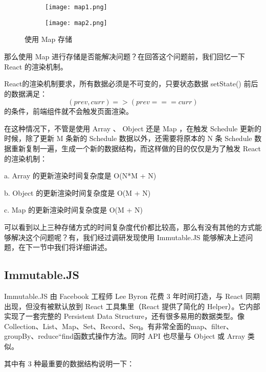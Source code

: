 \begin{figure}[!htp]
    \centering
    \begin{subfigure}{0.3\textwidth}
      \centering
      \texttt{[image: map1.png]}
      \caption{}
    \end{subfigure}
    \hspace{1cm}
    \begin{subfigure}{0.4\textwidth}
      \centering
      \texttt{[image: map2.png]}
      \caption{}
    \end{subfigure}
    \caption{使用 Map 存储}
    \label{fig:map}
  \end{figure}

  那么使用 Map 进行存储是否能解决问题？在回答这个问题前，我们回忆一下 React 的渲染机制。

  React的渲染机制要求，所有数据必须是不可变的，只要状态数据 setState() 前后的数据满足：
  \begin{equation}
    (prev, curr) => (prev === curr)
  \end{equation}
  的条件，前端组件就不会触发页面渲染。

  在这种情况下，不管是使用 Array 、 Object 还是 Map ，在触发 Schedule 更新的时候，除了更新 M 条新的 Schedule 数据以外，还需要将原本的 N 条 Schedule 数据重新复制一遍，生成一个新的数据结构，而这样做的目的仅仅是为了触发 React 的渲染机制：

  \quad{}a. Array 的更新渲染时间复杂度是 O(N*M + N)


  \quad{}b. Object 的更新渲染时间复杂度是 O(M + N)


  \quad{}c. Map 的更新渲染时间复杂度是 O(M + N)

  可以看到以上三种存储方式的时间复杂度代价都比较高，那么有没有其他的方式能够解决这个问题呢？有，我们经过调研发现使用 Immutable.JS 能够解决上述问题，在下一节中我们将详细讲述。

  \subsection{Immutable.JS}
  Immutable.JS 由 Facebook 工程师 Lee Byron 花费 3 年时间打造，与 React 同期出现，但没有被默认放到 React 工具集里（React 提供了简化的 Helper）。它内部实现了一套完整的 Persistent Data Structure，还有很多易用的数据类型。像 Collection、List、Map、Set、Record、Seq。有非常全面的map、filter、groupBy、reduce``find函数式操作方法。同时 API 也尽量与 Object 或 Array 类似。

其中有 3 种最重要的数据结构说明一下：

